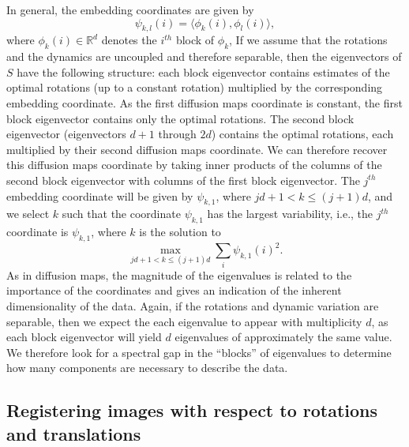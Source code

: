 \documentclass{pnastwo}
\begin{document}
\begin{article}
In general, the embedding coordinates are given by
\begin{equation} \label{eq:vdm_coord}
\psi_{k,l} (i) = \langle \phi_k(i), \phi_l(i) \rangle,
\end{equation}
where $\phi_k(i) \in \mathbb{R}^d$ denotes the $i^{th}$ block of $\phi_k$, 
%
If we assume that the rotations and the dynamics are uncoupled and therefore separable, then the eigenvectors of $S$ have the following structure: each block eigenvector contains estimates of the optimal rotations (up to a constant rotation) multiplied by the corresponding embedding coordinate.
%
As the first diffusion maps coordinate is constant, the first block eigenvector contains only the optimal rotations.
%
The second block eigenvector (eigenvectors $d+1$ through $2d$) contains the optimal rotations, each multiplied by their second diffusion maps coordinate. 
%
We can therefore recover this diffusion maps coordinate by taking inner products of the columns of the second block eigenvector with columns of the first block eigenvector.
%
The $j^{th}$ embedding coordinate will be given by $\psi_{k,1}$, where $jd +1 < k \le (j+1)d$,
and we select $k$ such that the coordinate $\psi_{k, 1}$ has the largest variability, i.e., the $j^{th}$ coordinate is $\psi_{k,1}$, where $k$ is the solution to
$$ \max_{jd +1 < k \le (j+1)d} \sum_i \psi_{k,1} (i)^2. $$
%
As in diffusion maps, the magnitude of the eigenvalues is related to the importance of the coordinates and gives an indication of the inherent dimensionality of the data. 
%
Again, if the rotations and dynamic variation are separable, then we expect the each eigenvalue to appear with multiplicity $d$, as each block eigenvector will yield $d$ eigenvalues of approximately the same value. 
%
We therefore look for a spectral gap in the ``blocks'' of eigenvalues to determine how many components are necessary to describe the data.


\subsection{Registering images with respect to rotations and translations} \label{subsec:trans_rot_register}


\end{article}
\end{document}
